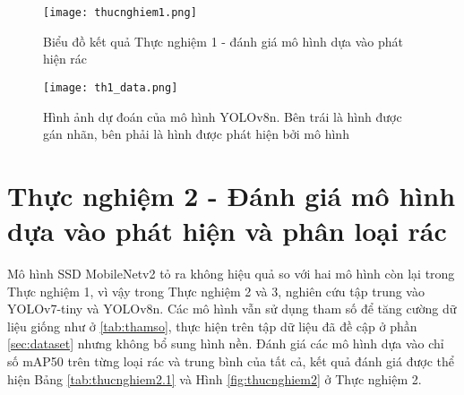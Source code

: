 \documentclass[../the.tex]{subfiles}
\begin{document}
\begin{figure}[H]
    \centering
    \texttt{[image: thucnghiem1.png]}
    \caption{Biểu đồ kết quả Thực nghiệm 1 - đánh giá mô hình dựa vào phát hiện rác}
    \label{fig:thucnghiem1}
\end{figure}


\begin{figure}[H]
    \centering
    \texttt{[image: th1\_data.png]}
    \caption{Hình ảnh dự đoán của mô hình YOLOv8n. Bên trái là hình được gán nhãn, bên phải là hình được phát hiện bởi mô hình}
    \label{fig:thucnghiem1.3}
\end{figure}

\section{Thực nghiệm 2 - Đánh giá mô hình dựa vào phát hiện và phân loại rác}

 {\fontsize{13}{12} \selectfont

  Mô hình SSD MobileNetv2 tỏ ra không hiệu quả so với hai mô hình còn lại trong Thực nghiệm 1, vì vậy trong Thực nghiệm 2 và 3, nghiên cứu tập trung vào YOLOv7-tiny và YOLOv8n.
  Các mô hình vẫn sử dụng tham số để tăng cường dữ liệu giống như ở \ref{tab:thamso}, thực hiện trên tập dữ liệu đã đề cập ở phần \ref{sec:dataset} nhưng không bổ sung hình nền.
  Đánh giá các mô hình dựa vào chỉ số mAP50 trên từng loại rác và trung bình của tất cả, kết quả đánh giá được thể hiện Bảng \ref{tab:thucnghiem2.1} và Hình \ref{fig:thucnghiem2} ở Thực nghiệm 2.

 }

\bigskip
\end{document}
